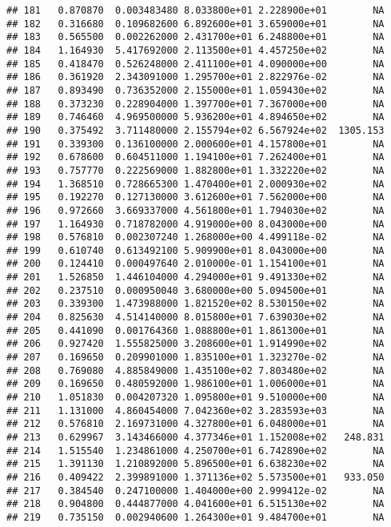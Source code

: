 \documentclass[
]{article}
\begin{document}
\begin{verbatim}
## 181   0.870870  0.003483480 8.033800e+01 2.228900e+01        NA
## 182   0.316680  0.109682600 6.892600e+01 3.659000e+01        NA
## 183   0.565500  0.002262000 2.431700e+01 6.248800e+01        NA
## 184   1.164930  5.417692000 2.113500e+01 4.457250e+02        NA
## 185   0.418470  0.526248000 2.411100e+01 4.090000e+00        NA
## 186   0.361920  2.343091000 1.295700e+01 2.822976e-02        NA
## 187   0.893490  0.736352000 2.155000e+01 1.059430e+02        NA
## 188   0.373230  0.228904000 1.397700e+01 7.367000e+00        NA
## 189   0.746460  4.969500000 5.936200e+01 4.894650e+02        NA
## 190   0.375492  3.711480000 2.155794e+02 6.567924e+02  1305.153
## 191   0.339300  0.136100000 2.000600e+01 4.157800e+01        NA
## 192   0.678600  0.604511000 1.194100e+01 7.262400e+01        NA
## 193   0.757770  0.222569000 1.882800e+01 1.332220e+02        NA
## 194   1.368510  0.728665300 1.470400e+01 2.000930e+02        NA
## 195   0.192270  0.127130000 3.612600e+01 7.562000e+00        NA
## 196   0.972660  3.669337000 4.561800e+01 1.794030e+02        NA
## 197   1.164930  0.718782000 4.919000e+00 8.043000e+00        NA
## 198   0.576810  0.002307240 1.268000e+00 4.499118e-02        NA
## 199   0.610740  0.613492100 5.909900e+01 8.043000e+00        NA
## 200   0.124410  0.000497640 2.010000e-01 1.154100e+01        NA
## 201   1.526850  1.446104000 4.294000e+01 9.491330e+02        NA
## 202   0.237510  0.000950040 3.680000e+00 5.094500e+01        NA
## 203   0.339300  1.473988000 1.821520e+02 8.530150e+02        NA
## 204   0.825630  4.514140000 8.015800e+01 7.639030e+02        NA
## 205   0.441090  0.001764360 1.088800e+01 1.861300e+01        NA
## 206   0.927420  1.555825000 3.208600e+01 1.914990e+02        NA
## 207   0.169650  0.209901000 1.835100e+01 1.323270e-02        NA
## 208   0.769080  4.885849000 1.435100e+02 7.803480e+02        NA
## 209   0.169650  0.480592000 1.986100e+01 1.006000e+01        NA
## 210   1.051830  0.004207320 1.095800e+01 9.510000e+00        NA
## 211   1.131000  4.860454000 7.042360e+02 3.283593e+03        NA
## 212   0.576810  2.169731000 4.327800e+01 6.048000e+01        NA
## 213   0.629967  3.143466000 4.377346e+01 1.152008e+02   248.831
## 214   1.515540  1.234861000 4.250700e+01 6.742890e+02        NA
## 215   1.391130  1.210892000 5.896500e+01 6.638230e+02        NA
## 216   0.409422  2.399891000 1.371136e+02 5.573500e+01   933.050
## 217   0.384540  0.247100000 1.404000e+00 2.999412e-02        NA
## 218   0.904800  0.444877000 4.041600e+01 6.515130e+02        NA
## 219   0.735150  0.002940600 1.264300e+01 9.484700e+01        NA

\end{verbatim}
\end{document}
